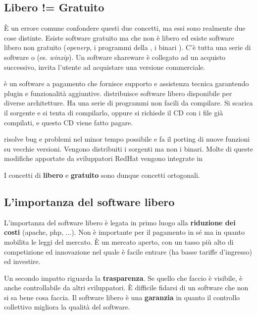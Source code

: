 \subsection{Libero != Gratuito}

È un errore comune confondere questi due concetti, ma essi sono realmente due cose distinte. Esiste software gratuito ma che non è libero ed esiste software libero non gratuito (\textit{openerp}, i programmi della , i binari ). C'è tutta una serie di software  o  (es. \textit{winzip}). Un software shareware è collegato ad un acquisto successivo, invita l'utente ad acquistare una versione commerciale.

 è un software a pagamento che fornisce supporto e assistenza tecnica garantendo plugin e funzionalità aggiuntive. 
 distribuisce software libero disponibile per diverse architetture. Ha una serie di programmi non facili da compilare. Si scarica il sorgente e si tenta di compilarlo, oppure si richiede il CD con i file già compilati, e questo CD viene fatto pagare.

 risolve bug e problemi nel minor tempo possibile e fa il porting di nuove funzioni su vecchie versioni. Vengono distribuiti i sorgenti ma non i binari. Molte di queste modifiche apportate da sviluppatori RedHat vengono integrate in 

I concetti di \textbf{libero} e \textbf{gratuito} sono dunque concetti ortogonali.

\subsection{L'importanza del software libero}

L'importanza del software libero è legata in primo luogo alla \textbf{riduzione dei costi} (apache, php, ...). Non è importante per il pagamento in sé ma in quanto mobilita le leggi del mercato. È un mercato aperto, con un tasso più alto di competizione ed innovazione nel quale è facile entrare (ha basse tariffe d'ingresso) ed investire.

Un secondo impatto riguarda la \textbf{trasparenza}. Se quello che faccio è visibile, è anche controllabile da altri sviluppatori. È difficile fidarsi di un software che non si sa bene cosa faccia. Il software libero è una \textbf{garanzia} in quanto il controllo collettivo migliora la qualità del software.

